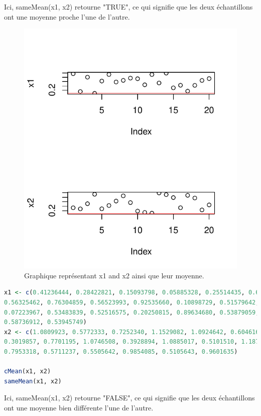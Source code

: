 Ici, sameMean(x1, x2) retourne "TRUE", ce qui signifie que les deux échantillons ont une moyenne proche l'une de l'autre.

\begin{figure}[htbp]
	\begin{center}
		\includegraphics[width=12cm]{diagrams/x1-x2-1.pdf}
		\caption{Graphique représentant x1 and x2 ainsi que leur moyenne.}
		\label{fig:x1-x2-1}
	\end{center}
\end{figure}

\begin{lstlisting}[language=R]
x1 <- c(0.41236444, 0.28422821, 0.15093798, 0.05885328, 0.25514435, 0.63026931,
0.56325462, 0.76304859, 0.56523993, 0.92535660, 0.10898729, 0.51579642,
0.07223967, 0.53483839, 0.52516575, 0.20250815, 0.89634680, 0.53879059,
0.58736912, 0.53945749)
x2 <- c(1.0809923, 0.5772333, 0.7252340, 1.1529082, 1.0924642, 0.6046166, 0.9495800,
0.3019857, 0.7701195, 1.0746508, 0.3928894, 1.0885017, 0.5101510, 1.1871599,
0.7953318, 0.5711237, 0.5505642, 0.9854085, 0.5105643, 0.9601635)

cMean(x1, x2)
sameMean(x1, x2)
\end{lstlisting}

Ici, sameMean(x1, x2) retourne "FALSE", ce qui signifie que les deux échantillons ont une moyenne bien différente l'une de l'autre.

